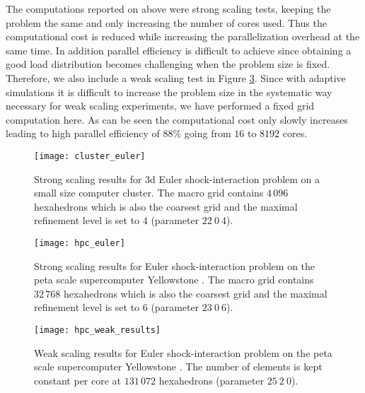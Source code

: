 \documentclass[10pt,notitlepage,a4paper]{article}
\begin{document}
The computations reported on above were strong scaling tests, keeping the
problem the same and only increasing the number of cores used. Thus the
computational cost is reduced while increasing the parallelization overhead at the
same time. In addition parallel efficiency is difficult to achieve since 
obtaining a good load distribution becomes challenging when the problem size is fixed. 
Therefore, we also include a weak scaling test in Figure \ref{fig:speedup_weak_hpc}.
Since with adaptive simulations it is difficult to increase the  problem size
in the systematic way necessary for weak scaling experiments, we have
performed a fixed grid computation here.
As can be seen the
computational cost only slowly increases leading to high parallel
efficiency of $88\%$ going from $16$ to $8192$ cores. 

\begin{figure}[!ht]
\begin{center}
  \texttt{[image: cluster\_euler]}
  \caption{Strong scaling results for 3d Euler shock-interaction problem on a small size
  computer cluster. The macro grid contains $4\,096$ hexahedrons which is also the
  coarsest grid and the maximal refinement level is set to $4$ (parameter $22\ 0\ 4$).}
  \label{fig:speedup_strong_cluster3d}
\end{center}
\end{figure}  

\begin{figure}[!ht]
\begin{center}
  \texttt{[image: hpc\_euler]}
  \caption{Strong scaling results for Euler shock-interaction problem on the peta scale
  supercomputer Yellowstone \cite{Yellowstone}. 
  The macro grid contains $32\,768$ hexahedrons which is also the 
    coarsest grid and the maximal refinement level is set to $6$ (parameter $23\ 0\ 6$).}
  \label{fig:speedup_strong_hpc}
\end{center}
\end{figure}  

\begin{figure}[!ht]
\begin{center}
  \texttt{[image: hpc\_weak\_results]}
  \caption{Weak scaling results for Euler shock-interaction problem on the peta scale
    supercomputer Yellowstone \cite{Yellowstone}. The number of elements is kept
    constant per core at $131\,072$ hexahedrons (parameter $25\ 2\ 0$).}
  \label{fig:speedup_weak_hpc}
\end{center}
\end{figure}  
\end{document}

